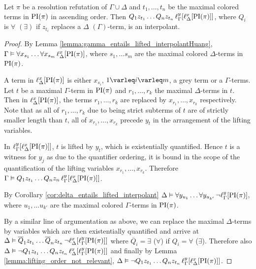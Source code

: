 \begin{thm}
	Let $\pi$ be a resolution refutation of $\Gamma \cup \Delta$ and
	$t_1, \dots, t_n$ be the maximal colored terms in $\PI(\pi)$ in ascending order.
	Then
	$Q_1 z_{t_1} \ldots Q_n z_{t_n}\,\lifgamma{\lifdelta{\PI(\pi)}}$, where $Q_i$ is $\forall$ $(\exists)$ if $z_{t_i}$ replaces a $\Delta$ $(\Gamma)$-term, is an interpolant.
\end{thm}
\begin{proof}
	By Lemma \ref{lemma:gamma_entails_lifted_interpolantHuang}, $\Gamma \entails \forall x_{s_1} \ldots \forall x_{s_m}\,\lifdelta{\PI(\pi)}$, where $s_1, \dots s_m$ are the maximal colored $\Delta$-terms in $\PI(\pi)$.

	A term in $\lifdelta{\PI(\pi)}$ is either $x_{s_i}$, $1 \varleq i \varleq m$, a grey term or a $\Gamma$-terms.
	Let $t$ be a maximal $\Gamma$-term in $\PI(\pi)$ and ${r_1}, \dots, {r_k}$ the maximal $\Delta$-terms in\nolinebreak{} $t$.
	Then in $\lifdelta{\PI(\pi)}$, the terms ${r_1}, \dots, {r_k}$ are replaced by $x_{r_1}, \dots, x_{r_k}$ respectively.
	Note that as all of ${r_1}, \dots, {r_k}$ due to being strict subterms of $t$ are of strictly smaller length than $t$, all of $x_{r_1}, \dots, x_{r_k}$ precede $y_t$ in the arrangement of the lifting variables.


	In $\lifgamma{\lifdelta{\PI(\pi)}}$, $t$ is lifted by $y_t$, which is existentially quantified.
	Hence $t$ is a witness for $y_j$ as due to the quantifier ordering,
	it is bound in the scope of the quantification of the lifting variables $x_{r_1}, \dots, x_{r_k}$.
	Therefore $\Gamma \entails Q_1 z_{t_1} \ldots Q_n z_n\,\lifgamma{\lifdelta{\PI(\pi)}}$.

	By Corollary \ref{cor:delta_entails_lifted_interpolant} $\Delta \entails \forall y_{u_1} \dots \forall y_{u_{k'}}\,\lnot \lift{\Gamma}{\PI(\pi)}{y}$, where $u_1, \dots u_{k'}$ are the maximal colored $\Gamma$-terms in $\PI(\pi)$.

	By a similar line of argumentation as above, we can replace the maximal $\Delta$-\nolinebreak{}terms by variables which are then existentially quantified and arrive at
	$\Delta \entails\nolinebreak{} \overline Q_1 z_{t_1} \dots \overline Q_n z_{t_n}\,\lnot \lft{\Delta}{x}{\lft{\Gamma}{y}{\PI(\pi)}}$ where $\overline Q_i = \exists$ ($\forall$) if $Q_i = \forall$ ($\exists$).
	Therefore also
	$\Delta \entails\nolinebreak{} \lnot Q_1 z_{t_1} \dots Q_n z_{t_n}\,\lft{\Delta}{x}{\lft{\Gamma}{y}{\PI(\pi)}}$ and
	finally by Lemma \ref{lemma:lifting_order_not_relevant},
	$\Delta \entails\nolinebreak{} \lnot Q_1 z_{t_1} \dots Q_n z_{t_n}\,\lft{\Gamma}{y}{\lft{\Delta}{x}{\PI(\pi)}}$.


\end{proof}

